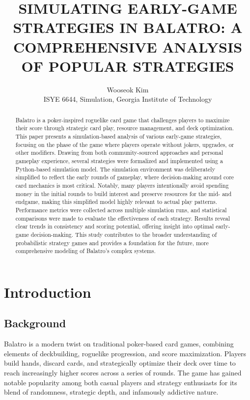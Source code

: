 \title{SIMULATING EARLY-GAME STRATEGIES IN BALATRO: A COMPREHENSIVE ANALYSIS OF POPULAR STRATEGIES}
\author{Wooseok Kim \\ ISYE 6644, Simulation, Georgia Institute of Technology}
\date{}


\maketitle

\begin{abstract}
Balatro is a poker-inspired roguelike card game that challenges players to maximize their score through strategic card play, resource management, and deck optimization. This paper presents a simulation-based analysis of various early-game strategies, focusing on the phase of the game where players operate without jokers, upgrades, or other modifiers. Drawing from both community-sourced approaches and personal gameplay experience, several strategies were formalized and implemented using a Python-based simulation model. The simulation environment was deliberately simplified to reflect the early rounds of gameplay, where decision-making around core card mechanics is most critical. Notably, many players intentionally avoid spending money in the initial rounds to build interest and preserve resources for the mid- and endgame, making this simplified model highly relevant to actual play patterns. Performance metrics were collected across multiple simulation runs, and statistical comparisons were made to evaluate the effectiveness of each strategy. Results reveal clear trends in consistency and scoring potential, offering insight into optimal early-game decision-making. This study contributes to the broader understanding of probabilistic strategy games and provides a foundation for the future, more comprehensive modeling of Balatro's complex systems.
\end{abstract}

\section{Introduction}
\subsection{Background}
Balatro is a modern twist on traditional poker-based card games, combining elements of deckbuilding, roguelike progression, and score maximization. Players build hands, discard cards, and strategically optimize their deck over time to reach increasingly higher scores across a series of rounds. The game has gained notable popularity among both casual players and strategy enthusiasts for its blend of randomness, strategic depth, and infamously addictive nature.

